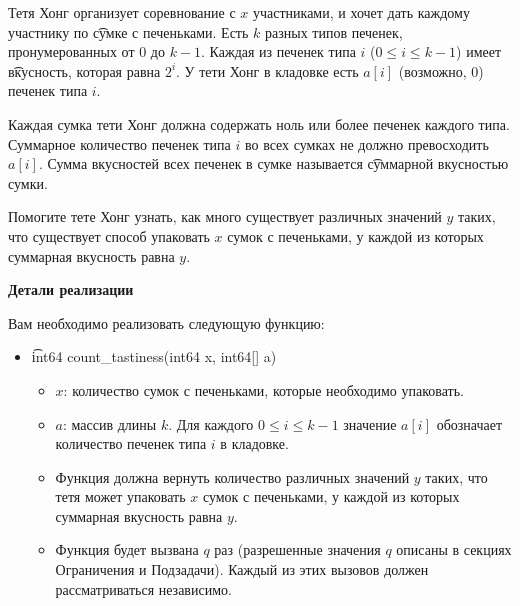 Тетя Хонг организует соревнование с $x$ участниками, и хочет дать каждому участнику по \t{сумке с печеньками}. Есть $k$ разных типов печенек, пронумерованных от $0$ до $k-1$. Каждая из печенек типа $i$ ($0 \leq i \leq k-1$) имеет \t{вкусность}, которая равна $2^i$. У тети Хонг в кладовке есть $a[i]$ (возможно, 0) печенек типа $i$.

Каждая сумка тети Хонг должна содержать ноль или более печенек каждого типа. Суммарное количество печенек типа $i$ во всех сумках не должно превосходить $a[i]$. Сумма вкусностей всех печенек в сумке называется \t{суммарной вкусностью} сумки.

Помогите тете Хонг узнать, как много существует различных значений $y$ таких, что существует способ упаковать $x$ сумок с печеньками, у каждой из которых суммарная вкусность равна $y$. 

\textbf{Детали реализации}

Вам необходимо реализовать следующую функцию:

\begin{itemize}
\item \t{int64 count\_tastiness(int64 x, int64[] a)}
\begin{itemize}
\item $x$: количество сумок с печеньками, которые необходимо упаковать.
\item $a$: массив длины $k$. Для каждого $0 \leq i \leq k-1$ значение $a[i]$ обозначает количество печенек типа $i$ в кладовке.
\item Функция должна вернуть количество различных значений $y$ таких, что тетя может упаковать $x$ сумок с печеньками, у каждой из которых суммарная вкусность равна $y$.
\item Функция будет вызвана $q$ раз (разрешенные значения $q$ описаны в секциях Ограничения и Подзадачи). Каждый из этих вызовов должен рассматриваться независимо. 
\end{itemize}
\end{itemize}

